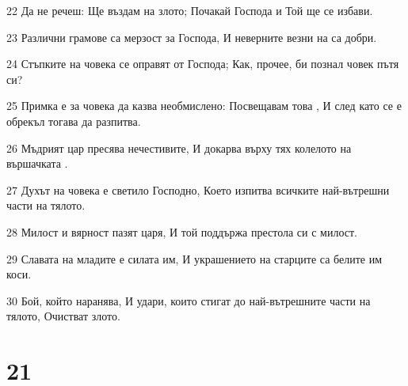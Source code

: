 \par 22 Да не речеш: Ще въздам на злото; Почакай Господа и Той ще се избави.
\par 23 Различни грамове са мерзост за Господа, И неверните везни на са добри.
\par 24 Стъпките на човека се оправят от Господа; Как, прочее, би познал човек пътя си?
\par 25 Примка е за човека да казва необмислено: Посвещавам това , И след като се е обрекъл тогава да разпитва.
\par 26 Мъдрият цар пресява нечестивите, И докарва върху тях колелото на вършачката .
\par 27 Духът на човека е светило Господно, Което изпитва всичките най-вътрешни части на тялото.
\par 28 Милост и вярност пазят царя, И той поддържа престола си с милост.
\par 29 Славата на младите е силата им, И украшението на старците са белите им коси.
\par 30 Бой, който наранява, И удари, които стигат до най-вътрешните части на тялото, Очистват злото.

\chapter{21}

